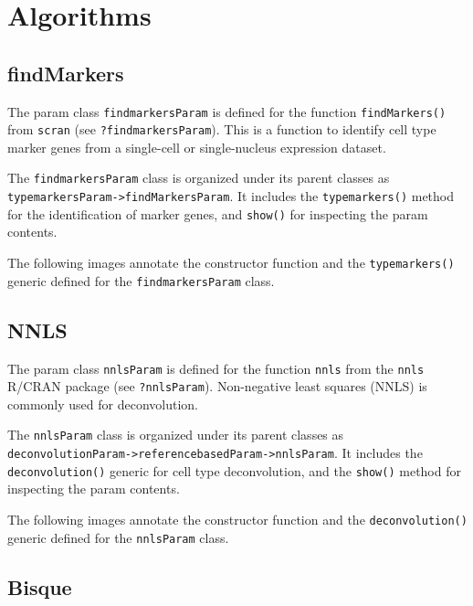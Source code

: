 \documentclass[]{article}
\begin{document}
\hypertarget{algorithms}{%
\section{Algorithms}\label{algorithms}}

\hypertarget{findmarkers}{%
\subsection{findMarkers}\label{findmarkers}}

The param class \texttt{findmarkersParam} is defined for the function \texttt{findMarkers()}
from \texttt{scran} (see \texttt{?findmarkersParam}). This is a function to identify cell type
marker genes from a single-cell or single-nucleus expression dataset.

The \texttt{findmarkersParam} class is organized under its parent classes as
\texttt{typemarkersParam-\textgreater{}findMarkersParam}. It includes the \texttt{typemarkers()} method for
the identification of marker genes, and \texttt{show()} for inspecting the param
contents.

The following images annotate the constructor function and the \texttt{typemarkers()}
generic defined for the \texttt{findmarkersParam} class.

\hypertarget{nnls}{%
\subsection{NNLS}\label{nnls}}

The param class \texttt{nnlsParam} is defined for the function \texttt{nnls} from the \texttt{nnls}
R/CRAN package (see \texttt{?nnlsParam}). Non-negative least squares (NNLS) is commonly
used for deconvolution.

The \texttt{nnlsParam} class is organized under its parent classes as
\texttt{deconvolutionParam-\textgreater{}referencebasedParam-\textgreater{}nnlsParam}. It includes the
\texttt{deconvolution()} generic for cell type deconvolution, and the \texttt{show()} method
for inspecting the param contents.

The following images annotate the constructor function and the \texttt{deconvolution()}
generic defined for the \texttt{nnlsParam} class.

\hypertarget{bisque}{%
\subsection{Bisque}\label{bisque}}
\end{document}
